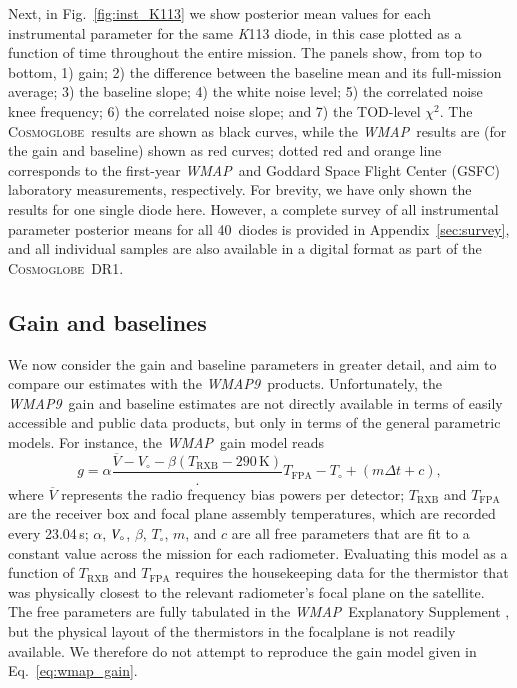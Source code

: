 \documentclass[twocolumn]{../../common/aa}
\def\WMAP{\emph{WMAP}}
\def\WMAPnine{\emph{WMAP9}}
\newcommand{\cosmoglobe}{\textsc{Cosmoglobe}}
\newcommand{\K}[0]{\textit K}
\newcommand{\V}[0]{\textit V}
\begin{document}
Next, in Fig.~\ref{fig:inst_K113} we show posterior mean values for each instrumental parameter for the same \K113 diode, in this case plotted as a function of time throughout the entire mission. The panels show, from top to bottom, 1) gain; 2) the difference between the baseline mean and its full-mission average; 3) the baseline slope; 4) the white noise level; 5) the correlated noise knee frequency; 6) the correlated noise slope; and 7) the TOD-level $\chi^2$. The \cosmoglobe\ results are shown as black curves, while the \WMAP\ results are (for the gain and baseline) shown as red curves; dotted red and orange line corresponds to the first-year \WMAP\ and Goddard Space Flight Center (GSFC) laboratory measurements, respectively. For brevity, we have only shown the results for one single diode here. However, a complete survey of all instrumental parameter posterior means for all 40~diodes is provided in Appendix~\ref{sec:survey}, and all individual samples are also available in a digital format as part of the \cosmoglobe\ DR1. 


\subsection{Gain and baselines}
\label{sec:gain}

We now consider the gain and baseline parameters in greater detail, and aim to compare our estimates with the \WMAPnine\ products. Unfortunately, the \WMAPnine\ gain and baseline estimates are not directly available in terms of easily accessible and public data products, but only in terms of the general parametric models. For instance, the \WMAP\ gain model reads \citet{wmapexsupp}
\begin{equation}
	\label{eq:wmap_gain}
	g=\alpha\frac{\overline V-V_\circ-\beta(T_\mathrm{RXB}-290\,\mathrm K)}.
	{T_\mathrm{FPA}-T_\circ}+(m\Delta t+c),
\end{equation}
where $\overline V$ represents the radio frequency bias powers per detector; $T_\mathrm{RXB}$ and $T_\mathrm{FPA}$ are the receiver box and focal plane assembly temperatures, which are recorded every 23.04\,s; $\alpha$, $\V_\circ$, $\beta$, $T_\circ$, $m$, and $c$ are all free parameters that are fit to a constant value across the mission for each radiometer. Evaluating this model as a function of $T_\mathrm{RXB}$ and $T_\mathrm{FPA}$ requires the housekeeping data for the thermistor that was physically closest to the relevant radiometer's focal plane on the satellite. The free parameters are fully tabulated in the \WMAP\ Explanatory Supplement \citep{wmapexsupp}, but the physical layout of the thermistors in the focalplane is not readily available. We therefore do not attempt to reproduce the gain model given in Eq.~\eqref{eq:wmap_gain}.
\end{document}
